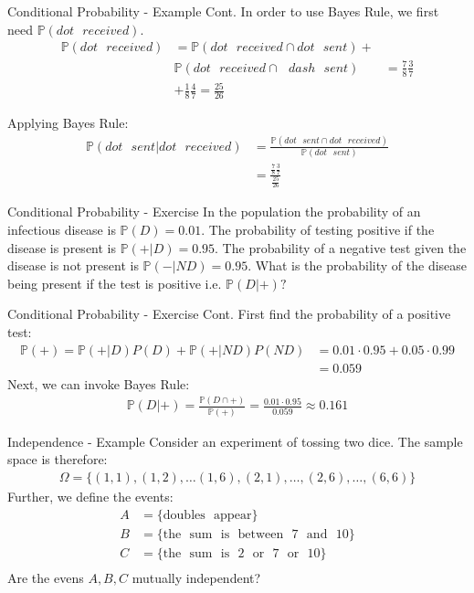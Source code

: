 \documentclass{beamer}
\begin{document}
\begin{frame}{Conditional Probability - Example Cont.}
In order to use Bayes Rule, we first need $\mathbb{P}(dot \>\>\> received)$.
\begin{align*}
\mathbb{P}(dot \>\>\> received) &= \mathbb{P}(dot \>\>\> received \cap dot \>\>\> sent) + \\ 
&\mathbb{P}(dot \>\>\> received \cap \>\>\> dash \>\>\> sent) &= \frac{7}{8}\frac{3}{7} \\
&+ \frac{1}{8}\frac{4}{7} = \frac{25}{26}
\end{align*}

Applying Bayes Rule:
\begin{align*}
\mathbb{P}(dot\>\>\> sent| dot \>\>\> received)  &= \frac{\mathbb{P}(dot \>\>\> sent \cap dot \>\>\> received)}{\mathbb{P}(dot \>\>\> sent)} \\
&= \frac{\frac{7}{8}\frac{3}{7}}{\frac{25}{26}}
\end{align*}
\end{frame}

\begin{frame}{Conditional Probability - Exercise}
In the population the probability of an infectious disease is $\mathbb{P}(D) = 0.01$. The probability of testing positive if the disease is present is $\mathbb{P}(+|D) = 0.95$. The probability of a negative test given the disease is not present is $\mathbb{P}(-|ND) = 0.95$. What is the probability of the disease being present if the test is positive i.e. $\mathbb{P}(D|+)?$
\end{frame}

\begin{frame}{Conditional Probability - Exercise Cont.}
First find the probability of a positive test:
\begin{align*}
\mathbb{P}(+) = \mathbb{P}(+|D)P(D) + \mathbb{P}(+|ND)P(ND) &= 0.01 \cdot 0.95 + 0.05 \cdot 0.99\\
 &= 0.059
\end{align*}
Next, we can invoke Bayes Rule:
\begin{align*}
\mathbb{P}(D|+) = \frac{\mathbb{P}(D \cap +)}{\mathbb{P}(+)} = \frac{0.01\cdot 0.95}{0.059} \approx 0.161
\end{align*}
\end{frame}

\begin{frame}{Independence - Example}
Consider an experiment of tossing two dice. The sample space is therefore:
\begin{align*}
\Omega = \{(1,1), (1,2),  \ldots (1,6), (2,1), \ldots, (2, 6), \ldots, (6,6)
\}
\end{align*}
Further, we define the events:
\begin{align*}
A &= \{\mathrm{doubles \>\>\> appear}\} \\
B &= \{\mathrm{the \>\>\> sum \>\>\> is \>\>\> between \>\>\> 7 \>\>\> and \>\>\> 10}\} \\
C &= \{\mathrm{the \>\>\> sum \>\>\> is \>\>\> 2 \>\>\> or \>\>\> 7 \>\>\> or \>\>\> 10}\} \\
\end{align*}
Are the evens $A, B, C$ mutually independent?
\end{frame}
\end{document}
